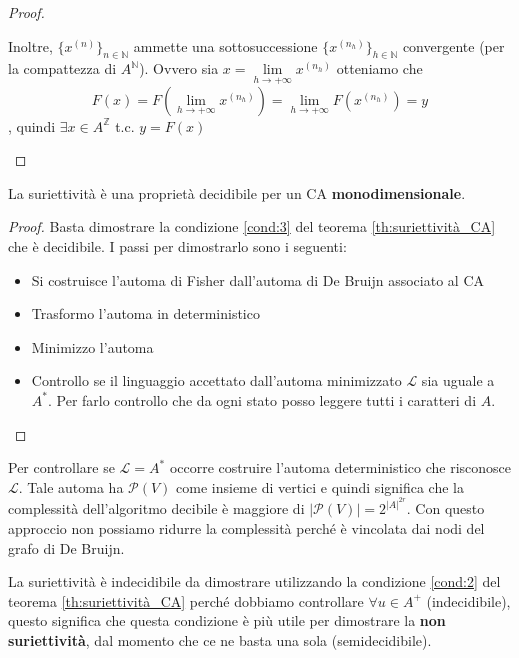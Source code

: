 \begin{teorema}
\begin{proof}
\begin{itemize}
                  Inoltre, $\{x^{(n)}\}_{n\in \mathbb{N}}$ ammette una sottosuccessione
                  $\{x^{(n_h)}\}_{h\in \mathbb{N}}$ convergente (per la compattezza di $A^{\mathbb{N}}$).
                  Ovvero sia $x= \lim\limits_{h\rightarrow +\infty}x ^{(n_h)}$ otteniamo  che $$ F(x)= F(\lim\limits_{h\rightarrow +\infty}x ^{(n_h)}) = \lim\limits_{h\rightarrow +\infty} F(x^{(n_h)})=y$$,
                  quindi $\exists x \in A^\mathbb{Z}$ t.c. $y = F(x)$
        \end{itemize}
    \end{proof}
\end{teorema}

\begin{teorema}
    La suriettività è una proprietà decidibile per un CA \textbf{monodimensionale}.
    \begin{proof}
        Basta dimostrare la condizione \ref{cond:3} del teorema \ref{th:suriettività_CA}
        che è decidibile. I passi per dimostrarlo sono i seguenti:
        \begin{itemize}
            \item Si costruisce l'automa di Fisher dall'automa di De Bruijn associato al CA
            \item Trasformo l'automa in deterministico
            \item Minimizzo l'automa
            \item Controllo se il linguaggio accettato dall'automa minimizzato $\mathcal{L}$ sia
                  uguale a $A^\ast$. Per farlo controllo che da ogni stato posso leggere
                  tutti i caratteri di $A$.
        \end{itemize}
    \end{proof}
\end{teorema}
\begin{nota}
    Per controllare se $\mathcal{L} = A^\ast$ occorre costruire l'automa deterministico
    che risconosce $ \mathcal{L}$. Tale automa ha $\mathcal{P}(V)$ come insieme di
    vertici e quindi significa che la complessità dell'algoritmo decibile è maggiore
    di $|\mathcal{P}(V)| = 2^{|A|^{2r}}$. Con questo approccio non possiamo ridurre
    la complessità perché è vincolata dai nodi del grafo di De Bruijn.
\end{nota}

\begin{nota}
    La suriettività è indecidibile da dimostrare utilizzando la condizione \ref{cond:2}
    del teorema \ref{th:suriettività_CA} perché dobbiamo controllare $\forall u \in A^+$ (indecidibile),
    questo significa che questa condizione è più utile per dimostrare la \textbf{non
        suriettività}, dal momento che ce ne basta una sola (semidecidibile).
\end{nota}

